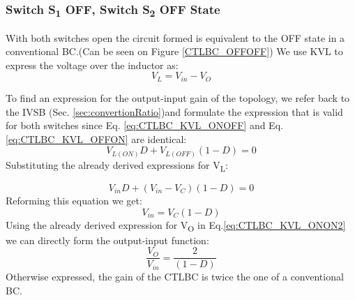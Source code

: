 \subsubsection{Switch S\textsubscript{1} OFF, Switch S\textsubscript{2} OFF State}
With both switches open the circuit formed is equivalent to the OFF state in a conventional BC.(Can be seen on Figure \ref{CTLBC_OFFOFF}) We use KVL to express the voltage over the inductor as: 
\begin{equation}
	V_{L}=V_{in}-V_{O}
	\label{eq:CTLBC_KVL_OFFOFF}
\end{equation}

To find an expression for the output-input gain of the topology, we refer back to the IVSB (Sec. \ref{sec:convertionRatio})and formulate the expression that is valid for both switches since Eq. \ref{eq:CTLBC_KVL_ONOFF} and Eq.\ref{eq:CTLBC_KVL_OFFON} are identical:
\begin{equation}
	V_{L(ON)}D+V_{L(OFF)}(1-D)=0
	\label{eq:CTLBC_IVSB}
\end{equation}
Substituting the already derived expressions for V\textsubscript{L}:

\begin{equation}
	V_{in}D+(V_{in} - V_C)(1-D)=0
	\label{eq:CTLBC_IVSB2}
\end{equation}
Reforming this equation we get: 
\begin{equation}
	V_{in}=V_C(1-D)
	\label{eq:CTLBC_IVSB3}
\end{equation}
Using the already derived expression for V\textsubscript{O} in Eq.\ref{eq:CTLBC_KVL_ONON2} we can directly form the output-input function: 
\begin{equation}
	\frac{V_O}{V_{in}}=\frac{2}{(1-D)}
	\label{eq:CTLBC_IVSB4}
\end{equation}
Otherwise expressed, the gain of the CTLBC is twice the one of a conventional BC. 
